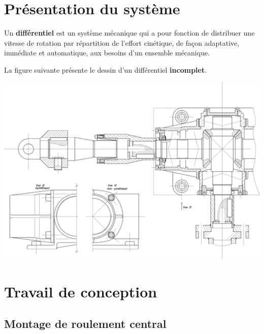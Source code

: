 

\section{Présentation du système}

Un \textbf{différentiel} est un système mécanique qui a pour fonction de distribuer une vitesse de rotation par répartition de l'effort cinétique, de façon adaptative, immédiate et automatique, aux besoins d'un ensemble mécanique.

La figure suivante présente le dessin d'un différentiel \textbf{incomplet}.

\begin{center}
 \includegraphics[width=0.7\linewidth]{img/Calque_vierge}
\end{center}

\section{Travail de conception}

\subsection{Montage de roulement central}

